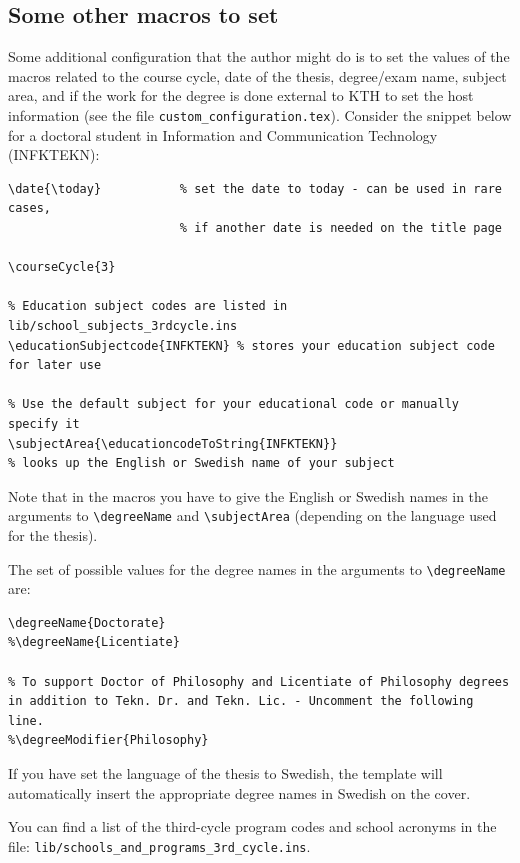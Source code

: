 \documentclass[12pt, twoside]{article}
\newcommand{\fname}[1]{\texttt{#1}}
\begin{document}
\subsection{Some other macros to set}
Some additional configuration that the author might do is to set the values of the macros related to the course cycle, date of the thesis, degree/exam name, subject area, and if the work for the degree is done external to \gls{KTH} to set the host information (see the file \fname{custom\_configuration.tex}). Consider the snippet below for a doctoral student in Information and Communication Technology (INFKTEKN):
\begin{lstlisting}[style=latexExampleForAuthors]
\date{\today}           % set the date to today - can be used in rare cases,
                        % if another date is needed on the title page
                        
\courseCycle{3}

% Education subject codes are listed in lib/school_subjects_3rdcycle.ins
\educationSubjectcode{INFKTEKN} % stores your education subject code for later use

% Use the default subject for your educational code or manually specify it
\subjectArea{\educationcodeToString{INFKTEKN}}
% looks up the English or Swedish name of your subject
\end{lstlisting}

Note that in the macros you have to give the English or Swedish names in the arguments to \texttt{\textbackslash degreeName} and \texttt{\textbackslash subjectArea} (depending on the language used for the thesis).

The set of possible values for the degree names in the arguments to \texttt{\textbackslash degreeName} are:
\begin{lstlisting}[style=latexExampleForAuthors]
\degreeName{Doctorate}
%\degreeName{Licentiate}

% To support Doctor of Philosophy and Licentiate of Philosophy degrees in addition to Tekn. Dr. and Tekn. Lic. - Uncomment the following line.
%\degreeModifier{Philosophy}
\end{lstlisting}

\noindent If you have set the language of the thesis to Swedish, the template will automatically insert the appropriate degree names in Swedish on the cover.

You can find a list of the third-cycle program codes and school acronyms in the file: \texttt{lib/schools\_and\_programs\_3rd\_cycle.ins}.
\end{document}
